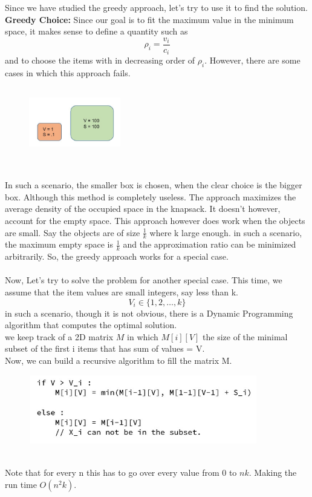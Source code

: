 \documentclass[12pt]{report}
\begin{document}
Since we have studied the greedy approach, let's try to use it to find the solution.\\
\textbf{Greedy Choice:} Since our goal is to fit the maximum value in the minimum space, it makes sense to define a quantity such as 
\[\rho_i = \frac{v_i}{c_i}\]
and to choose the items with in decreasing order of $\rho_i$. However, there are some cases in which this approach fails.\\
\begin{figure}[h]
\includegraphics[width=4cm, height=3cm]{knap_greedy.jpg}
\centering
\end{figure}\\
In such a scenario, the smaller box is chosen, when the clear choice is the bigger box.
Although this method is completely useless. The approach maximizes the average density of the occupied space in the knapsack. It doesn't however, account for the empty space. This approach however does work when the objects are small. Say the objects are of size $\frac{1}{k}$ where k large enough. in such a scenario, the maximum empty space is $\frac{1}{k}$ and the approximation ratio can be minimized arbitrarily. So, the greedy approach works for a special case.
\\\\
Now, Let's try to solve the problem for another special case. This time, we assume that the item values are small integers, say less than k.
\[V_i \in \{1, 2,\ldots, k\}\]
in such a scenario, though it is not obvious, there is a Dynamic Programming algorithm that computes the optimal solution. \\
we keep track of a 2D matrix $M$ in which $M[i][V]$ the size of the minimal subset of the first i items that has sum of values = V. \\ 
Now, we can build a recursive algorithm to fill the matrix M.
\begin{figure}[h]
\includegraphics[width=10cm, height=3cm]{knap_rec.jpg}
\centering
\end{figure}\\
Note that for every n this has to go over every value from 0 to $nk$. Making the run time $O(n^2k)$.
\end{document}
